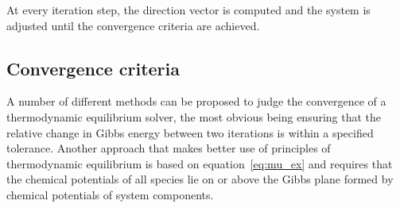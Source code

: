 At every iteration step, the direction vector is computed and the system is adjusted until the convergence criteria are achieved.


\subsection{Convergence criteria}
	A number of different methods can be proposed to judge the convergence of a thermodynamic equilibrium solver, the most obvious being ensuring that the relative change in Gibbs energy between two iterations is within a specified tolerance. Another approach that makes better use of principles of thermodynamic equilibrium is based on equation~\eqref{eq:mu_ex} and requires that the chemical potentials of all species lie on or above the Gibbs plane formed by chemical potentials of system components.
